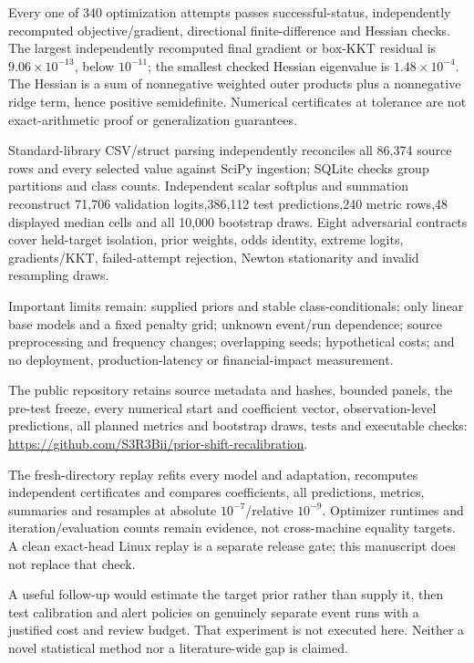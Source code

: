\documentclass[10pt]{article}
\newcommand{\smallhead}[1]{\vspace{6pt}{\large\bfseries #1}\par}
\begin{document}
\smallhead{Independent checks and limits}
Every one of 340 optimization attempts passes successful-status, independently recomputed objective/gradient, directional finite-difference and Hessian checks. The largest independently recomputed final gradient or box-KKT residual is $9.06\times10^{-13}$, below $10^{-11}$; the smallest checked Hessian eigenvalue is $1.48\times10^{-4}$. The Hessian is a sum of nonnegative weighted outer products plus a nonnegative ridge term, hence positive semidefinite. Numerical certificates at tolerance are not exact-arithmetic proof or generalization guarantees.

Standard-library CSV/struct parsing independently reconciles all 86,374 source rows and every selected value against SciPy ingestion; SQLite checks group partitions and class counts. Independent scalar softplus and summation reconstruct 71,706 validation logits,386,112 test predictions,240 metric rows,48 displayed median cells and all 10,000 bootstrap draws. Eight adversarial contracts cover held-target isolation, prior weights, odds identity, extreme logits, gradients/KKT, failed-attempt rejection, Newton stationarity and invalid resampling draws.

Important limits remain: supplied priors and stable class-conditionals; only linear base models and a fixed penalty grid; unknown event/run dependence; source preprocessing and frequency changes; overlapping seeds; hypothetical costs; and no deployment, production-latency or financial-impact measurement.
\newpage

\smallhead{Reproduction and next study}
The public repository retains source metadata and hashes, bounded panels, the pre-test freeze, every numerical start and coefficient vector, observation-level predictions, all planned metrics and bootstrap draws, tests and executable checks:
\url{https://github.com/S3R3Bii/prior-shift-recalibration}.

The fresh-directory replay refits every model and adaptation, recomputes independent certificates and compares coefficients, all predictions, metrics, summaries and resamples at absolute $10^{-7}$/relative $10^{-9}$. Optimizer runtimes and iteration/evaluation counts remain evidence, not cross-machine equality targets. A clean exact-head Linux replay is a separate release gate; this manuscript does not replace that check.

A useful follow-up would estimate the target prior rather than supply it, then test calibration and alert policies on genuinely separate event runs with a justified cost and review budget. That experiment is not executed here. Neither a novel statistical method nor a literature-wide gap is claimed.
\end{document}
